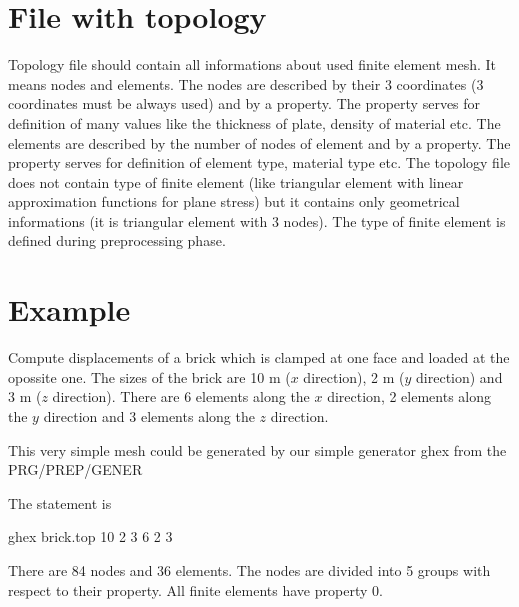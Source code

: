 
\section{File with topology}
Topology file should contain all informations about used finite element mesh.
It means nodes and elements. The nodes are described by their 3 coordinates
(3 coordinates must be always used) and by a property. The property serves
for definition of many values like the thickness of plate, density of material etc.
The elements are described by the number of nodes of element and by a property.
The property serves for definition of element type, material type etc. The topology
file does not contain type of finite element (like triangular element with linear
approximation functions for plane stress) but it contains only geometrical
informations (it is triangular element with 3 nodes). The type of finite element
is defined during preprocessing phase.

\section{Example}

Compute displacements of a brick which is clamped at one face and loaded at the
opossite one. The sizes of the brick are 10 m ($x$ direction), 2 m ($y$ direction) and
3 m ($z$ direction). There are 6 elements along the $x$ direction, 2 elements
along the $y$ direction and 3 elements along the $z$ direction.

This very simple mesh could be generated by our simple generator ghex from the
PRG/PREP/GENER

The statement is

ghex brick.top 10 2 3 \hspace{4mm} 6 2 3

There are 84 nodes and 36 elements. The nodes are divided into 5 groups with respect
to their property. All finite elements have property 0.


